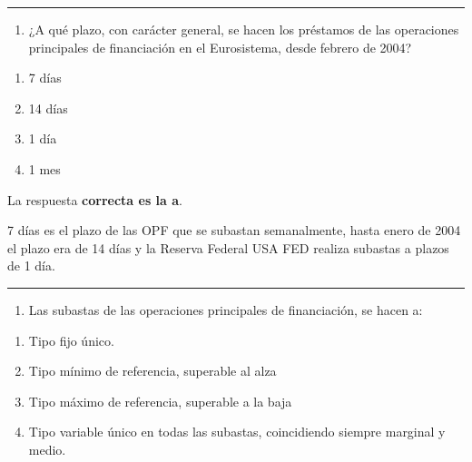 \documentclass[
  letterpaper,
  DIV=11,
  numbers=noendperiod]{scrreprt}
\providecommand{\tightlist}{%
  \setlength{\itemsep}{0pt}\setlength{\parskip}{0pt}}\usepackage{longtable,booktabs,array}
\begin{document}
\begin{center}\rule{0.5\linewidth}{0.5pt}\end{center}

\begin{enumerate}
\def\labelenumi{\arabic{enumi}.}
\setcounter{enumi}{37}
\tightlist
\item
  ¿A qué plazo, con carácter general, se hacen los préstamos de las
  operaciones principales de financiación en el Eurosistema, desde
  febrero de 2004?
\end{enumerate}

\begin{enumerate}
\def\labelenumi{\alph{enumi})}
\item
  7 días
\item
  14 días
\item
  1 día
\item
  1 mes
\end{enumerate}

\begin{tcolorbox}[enhanced jigsaw, left=2mm, opacityback=0, colback=white, breakable, arc=.35mm, bottomrule=.15mm, rightrule=.15mm, toprule=.15mm, leftrule=.75mm, colframe=quarto-callout-tip-color-frame]
\begin{minipage}[t]{5.5mm}
\textcolor{quarto-callout-tip-color}{\faLightbulb}
\end{minipage}%
\begin{minipage}[t]{\textwidth - 5.5mm}

La respuesta \textbf{correcta es la a}.

7 días es el plazo de las OPF que se subastan semanalmente, hasta enero
de 2004 el plazo era de 14 días y la Reserva Federal USA FED realiza
subastas a plazos de 1 día.

\end{minipage}%
\end{tcolorbox}

\begin{center}\rule{0.5\linewidth}{0.5pt}\end{center}

\begin{enumerate}
\def\labelenumi{\arabic{enumi}.}
\setcounter{enumi}{38}
\tightlist
\item
  Las subastas de las operaciones principales de financiación, se hacen
  a:
\end{enumerate}

\begin{enumerate}
\def\labelenumi{\alph{enumi})}
\item
  Tipo fijo único.
\item
  Tipo mínimo de referencia, superable al alza
\item
  Tipo máximo de referencia, superable a la baja
\item
  Tipo variable único en todas las subastas, coincidiendo siempre
  marginal y medio.
\end{enumerate}
\end{document}

